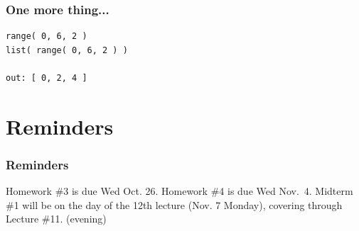 \documentclass[11pt]{beamer}
\begin{document}
\begin{frame}[fragile]
  \frametitle{One more thing...}
  \Enlarge

  \begin{Verbatim}
range( 0, 6, 2 )
list( range( 0, 6, 2 ) ) 

out: [ 0, 2, 4 ]
  \end{Verbatim}
\end{frame}

\section{Reminders}

\begin{frame}
  \frametitle{Reminders}
  \Enlarge

 \begin{itemize}
 	\myitem  Homework \#3 is due Wed Oct. 26.
 	\myitem  Homework \#4 is due Wed Nov.\ 4.
 	\myitem Midterm \#1 will be on the day of the 12th lecture (Nov. 7 Monday), covering through Lecture \#11. (evening)
 \end{itemize}
\end{frame}
\end{document}
